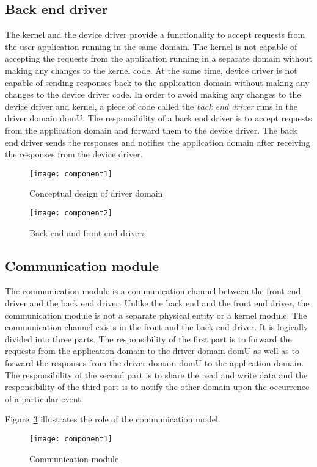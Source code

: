\subsection{Back end driver}
\label{subsec:backend}
The kernel and the device driver provide a functionality to accept requests from the user application running in the same domain. The kernel is not capable of accepting the requests from the application running in a separate domain without making any changes to the kernel code. At the same time, device driver is not capable of sending responses back to the application domain without making any changes to the device driver code. In order to avoid making any changes to the device driver and kernel, a piece of code called the \textit{back end driver} runs in the driver domain domU. The responsibility of a back end driver is to accept requests from the application domain and forward them to the device driver. The back end driver sends the responses and notifies the application domain after receiving the responses from the device driver.
\begin{figure}[!ht]
\centering
\texttt{[image: component1]}
\caption{Conceptual design of driver domain}
\label{fig:conept}
\end{figure}
\begin{figure}[!ht]
\centering
\texttt{[image: component2]}
\caption{Back end and front end drivers}
\label{fig:backendfrontend}
\end{figure}

\subsection{Communication module}
The communication module is a communication channel between the front end driver and the back end driver. Unlike the back end and the front end driver, the communication module is not a separate physical entity or a kernel module. The communication channel exists in the front and the back end driver. It is logically divided into three parts. The responsibility of the first part is to forward the requests from the application domain to the driver domain domU as well as to forward the responses from the driver domain domU to the application domain. The responsibility of the second part is to share the read and write data and the responsibility of the third part is to notify the other domain upon the occurrence of a particular event. 

Figure~\ref{fig:communication} illustrates the role of the communication model. 
\begin{figure}[!ht]
\centering
\texttt{[image: component1]}
\caption{Communication module}
\label{fig:communication}
\end{figure}
\pagebreak

